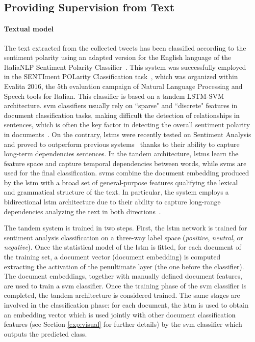 
\subsection{Providing Supervision from Text}
\label{subsec:vsa:method}

\paragraph{Textual model}
The text extracted from the collected tweets has been classified according to the sentiment polarity using an adapted version for the English language of the ItaliaNLP Sentiment Polarity Classifier~\cite{cimino2016tandem}.
This system was successfully employed in the SENTIment POLarity Classification task~\cite{barbieri2016overview}, which was organized within Evalita 2016, the 5th evaluation campaign of Natural Language Processing and Speech tools for Italian.
This classifier is based on a tandem LSTM-SVM architecture.
\gls{svm} classifiers usually rely on ``sparse" and ``discrete" features in document classification tasks, making difficult the detection of relationships in sentences, which is often the key factor in detecting the overall sentiment polarity in documents~\cite{tang2015document}.
On the contrary, \glspl{lstm} were recently tested on Sentiment Analysis and proved to outperform previous systems~\cite{nakov2016semeval} thanks to their ability to capture long-term dependencies sentences.
In the tandem architecture, \glspl{lstm} learn the feature space and capture temporal dependencies between words, while \glspl{svm} are used for the final classification.
\glspl{svm} combine the document embedding produced by the \gls{lstm} with a broad set of general-purpose features qualifying the lexical and grammatical structure of the text.
In particular, the system employs a bidirectional \gls{lstm} architecture due to their ability to capture long-range dependencies analyzing the text in both directions~\cite{schuster1997bidirectional}.

The tandem system is trained in two steps.
First, the \gls{lstm} network is trained for sentiment analysis classification on a three-way label space (\emph{positive}, \emph{neutral}, or \emph{negative}).
Once the statistical model of the \gls{lstm} is fitted, for each document of the training set, a document vector (document embedding) is computed extracting the activation of the penultimate layer (the one before the classifier).
The document embeddings, together with manually defined document features, are used to train a \gls{svm} classifier.
Once the training phase of the \gls{svm} classifier is completed, the tandem architecture is considered trained.
The same stages are involved in the classification phase: for each document, the \gls{lstm} is used to obtain an embedding vector which is used jointly with other document classification features (see Section \ref{exp:visual} for further details) by the \gls{svm} classifier which outputs the predicted class.

